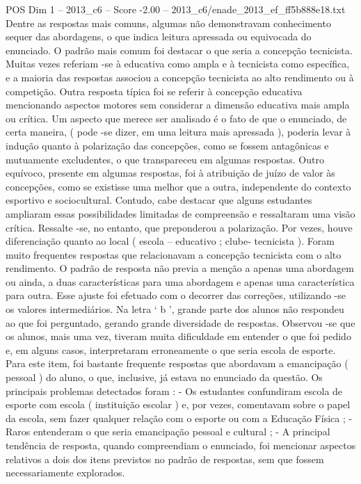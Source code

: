 \begin{textsample}{POS Dim 1 – 2013\_c6 – Score -2.00 – 2013\_c6/enade\_2013\_ef\_ff5b888e18.txt}
Dentre as respostas mais comuns, algumas não demonstravam conhecimento sequer das abordagens, o que indica leitura apressada ou equivocada do enunciado.
O padrão mais comum foi destacar o que seria a concepção tecnicista.
Muitas vezes referiam -se à educativa como ampla e à tecnicista como específica, e a maioria das respostas associou a concepção tecnicista ao alto rendimento ou à competição.
Outra resposta típica foi se referir à concepção educativa mencionando aspectos motores sem considerar a dimensão educativa mais ampla ou crítica.
Um aspecto que merece ser analisado é o fato de que o enunciado, de certa maneira, ( pode -se dizer, em uma leitura mais apressada ), poderia levar à indução quanto à polarização das concepções, como se fossem antagônicas e mutuamente excludentes, o que transpareceu em algumas respostas.
Outro equívoco, presente em algumas respostas, foi à atribuição de juízo de valor às concepções, como se existisse uma melhor que a outra, independente do contexto esportivo e sociocultural.
Contudo, cabe destacar que alguns estudantes ampliaram essas possibilidades limitadas de compreensão e ressaltaram uma visão crítica.
Ressalte -se, no entanto, que preponderou a polarização.
Por vezes, houve diferenciação quanto ao local ( escola – educativo ; clube- tecnicista ).
Foram muito frequentes respostas que relacionavam a concepção tecnicista com o alto rendimento.
O padrão de resposta não previa a menção a apenas uma abordagem ou ainda, a duas características para uma abordagem e apenas uma característica para outra.
Esse ajuste foi efetuado com o decorrer das correções, utilizando -se os valores intermediários.
Na letra ‘ b ’, grande parte dos alunos não respondeu ao que foi perguntado, gerando grande diversidade de respostas.
Observou -se que os alunos, mais uma vez, tiveram muita dificuldade em entender o que foi pedido e, em alguns casos, interpretaram erroneamente o que seria escola de esporte.
Para este item, foi bastante frequente respostas que abordavam a emancipação ( pessoal ) do aluno, o que, inclusive, já estava no enunciado da questão.
Os principais problemas detectados foram : - Os estudantes confundiram escola de esporte com escola ( instituição escolar ) e, por vezes, comentavam sobre o papel da escola, sem fazer qualquer relação com o esporte ou com a Educação Física ; - Raros entenderam o que seria emancipação pessoal e cultural ; - A principal tendência de resposta, quando compreendiam o enunciado, foi mencionar aspectos relativos a dois dos itens previstos no padrão de respostas, sem que fossem necessariamente explorados.

\end{textsample}
